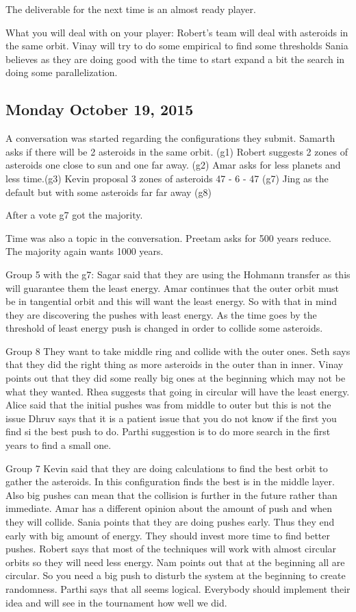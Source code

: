 The deliverable for the next time is an almost ready player.

What you will deal with on your player:
Robert’s team will deal with asteroids in the same orbit.
Vinay will try to do some empirical to find some thresholds
Sania believes as they are doing good with the time to start expand a bit the 
search in doing some parallelization. 
\subsection{Monday October 19, 2015}
A conversation was started regarding the configurations they submit.
Samarth asks if there will be 2 asteroids in the same orbit. (g1)
Robert suggests 2 zones of asteroids one close to sun and one far away. (g2)
Amar asks for less planets and less time.(g3)
Kevin proposal 3 zones of asteroids 47 - 6 - 47 (g7)
Jing as the default but with some asteroids far far away (g8)

After a vote g7 got the majority.

Time was also a topic in the conversation.
Preetam asks for 500 years reduce.
The majority again wants 1000 years.


Group 5 with the g7:
Sagar said that they are using the Hohmann transfer as this will guarantee them the least energy.
Amar continues that the outer orbit must be in tangential orbit and this will want the least energy.
So with that in mind they are discovering the pushes with least energy. As the time goes by the threshold of least energy push is changed in order to collide some asteroids.

Group 8
They want to take middle ring and collide with the outer ones.
Seth says that they did the right thing as more asteroids in the outer than in inner.
Vinay points out that they did some really big ones at the beginning which may not be what they wanted.
Rhea suggests that going in circular will have the least energy.
Alice said that the initial pushes was from middle to outer but this is not the issue
Dhruv says that it is a patient issue that you do not know if the first you find si the best push to do.
Parthi suggestion is to do more search in the first years to find a small one.

Group 7 
Kevin said that they are doing calculations to find the best orbit to gather the 
asteroids. In this configuration finds the best is in the middle layer. Also big 
pushes can mean that the collision is further in the future rather than immediate.
Amar has a different opinion about the amount of push and when they will collide.
Sania points that they are doing pushes early. Thus they end early with big amount of energy. They should invest more time to find better pushes.
Robert says that most of the techniques will  work with almost circular orbits so they will need less energy.
Nam points out that at the beginning all are circular. So you need a big push to disturb the system at the beginning to create randomness.
Parthi says that all seems logical. Everybody should implement their idea and will see in the tournament how well we did.

